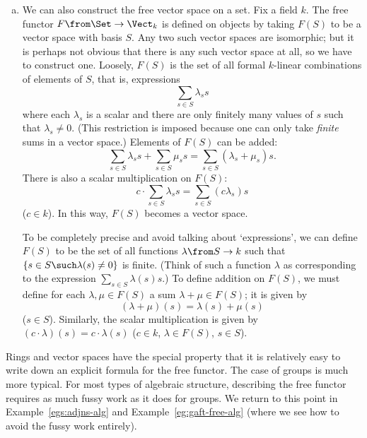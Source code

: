 \begin{examples}
\begin{enumerate}[(b)]
\item   
\label{eg:free-vs}
We can also construct the free%
%
%
vector space on a set.  Fix a field $k$.  The free functor $F\from \Set \to
\Vect_k$ is defined on objects by taking $F(S)$ to be a vector space with
basis $S$.  Any two such vector spaces are isomorphic; but it is perhaps
not obvious that there is any such vector space at all, so we have to
construct one.  Loosely, $F(S)$ is the set of all formal $k$-linear
combinations of elements of $S$, that is, expressions
\[
\sum_{s \in S} \lambda_s s
\]
where each $\lambda_s$ is a scalar and there are only finitely many values
of $s$ such that $\lambda_s \neq 0$.  (This restriction is imposed because
one can only take \emph{finite} sums in a vector space.)  Elements of
$F(S)$ can be added:
\[
\sum_{s \in S} \lambda_s s + \sum_{s \in S} \mu_s s 
=
\sum_{s \in S} (\lambda_s + \mu_s) s.
\]
There is also a scalar multiplication on $F(S)$:
\[
c \cdot \sum_{s \in S} \lambda_s s
=
\sum_{s \in S} (c \lambda_s) s
\]
($c \in k$).  In this way, $F(S)$ becomes a vector space.

To be completely precise and avoid talking about `expressions', we
can define $F(S)$ to be the set of all functions $\lambda\from S \to k$ such
that $\{ s \in S \such \lambda(s) \neq 0\}$ is finite.  (Think of such a
function $\lambda$ as corresponding to the expression $\sum_{s \in S}
\lambda(s) s$.)  To define addition on $F(S)$, we must define for each
$\lambda, \mu \in F(S)$ a sum $\lambda + \mu \in F(S)$; it is given by
\[
(\lambda + \mu)(s) = \lambda(s) + \mu(s)
\]
($s \in S$). Similarly, the scalar multiplication is given by $(c \cdot
\lambda)(s) = c\cdot \lambda(s)$ ($c \in k$, $\lambda \in F(S)$, $s \in
S$).  
\end{enumerate}

Rings and vector spaces have the special property that it is relatively
easy to write down an explicit formula for the free functor.  The case of
groups is much more typical.  For most types of algebraic structure,
describing the free functor requires as much fussy work as it does for
groups.  We return to this point in Example~\ref{egs:adjns-alg} and
Example~\ref{eg:gaft-free-alg} (where we see how to avoid the fussy work
entirely).
\end{examples}

